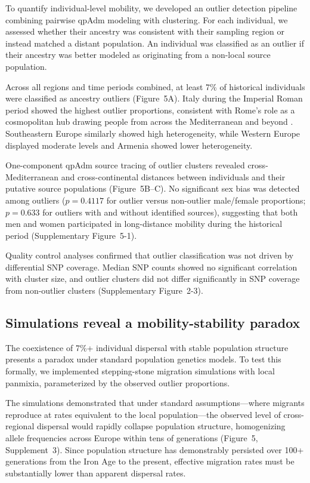 \documentclass[11pt]{article}
\begin{document}
To quantify individual-level mobility, we developed an outlier detection pipeline combining pairwise qpAdm modeling with clustering. For each individual, we assessed whether their ancestry was consistent with their sampling region or instead matched a distant population. An individual was classified as an outlier if their ancestry was better modeled as originating from a non-local source population.

Across all regions and time periods combined, at least 7\% of historical individuals were classified as ancestry outliers (Figure~5A). Italy during the Imperial Roman period showed the highest outlier proportions, consistent with Rome's role as a cosmopolitan hub drawing people from across the Mediterranean and beyond \citep{antonio2019ancient}. Southeastern Europe similarly showed high heterogeneity, while Western Europe displayed moderate levels and Armenia showed lower heterogeneity.

One-component qpAdm source tracing of outlier clusters revealed cross-Mediterranean and cross-continental distances between individuals and their putative source populations (Figure~5B--C). No significant sex bias was detected among outliers ($p = 0.4117$ for outlier versus non-outlier male/female proportions; $p = 0.633$ for outliers with and without identified sources), suggesting that both men and women participated in long-distance mobility during the historical period (Supplementary Figure~5-1).

Quality control analyses confirmed that outlier classification was not driven by differential SNP coverage. Median SNP counts showed no significant correlation with cluster size, and outlier clusters did not differ significantly in SNP coverage from non-outlier clusters (Supplementary Figure~2-3).

\subsection{Simulations reveal a mobility-stability paradox}

The coexistence of 7\%+ individual dispersal with stable population structure presents a paradox under standard population genetics models. To test this formally, we implemented stepping-stone migration simulations with local panmixia, parameterized by the observed outlier proportions.

The simulations demonstrated that under standard assumptions---where migrants reproduce at rates equivalent to the local population---the observed level of cross-regional dispersal would rapidly collapse population structure, homogenizing allele frequencies across Europe within tens of generations (Figure~5, Supplement~3). Since population structure has demonstrably persisted over 100+ generations from the Iron Age to the present, effective migration rates must be substantially lower than apparent dispersal rates.
\end{document}
